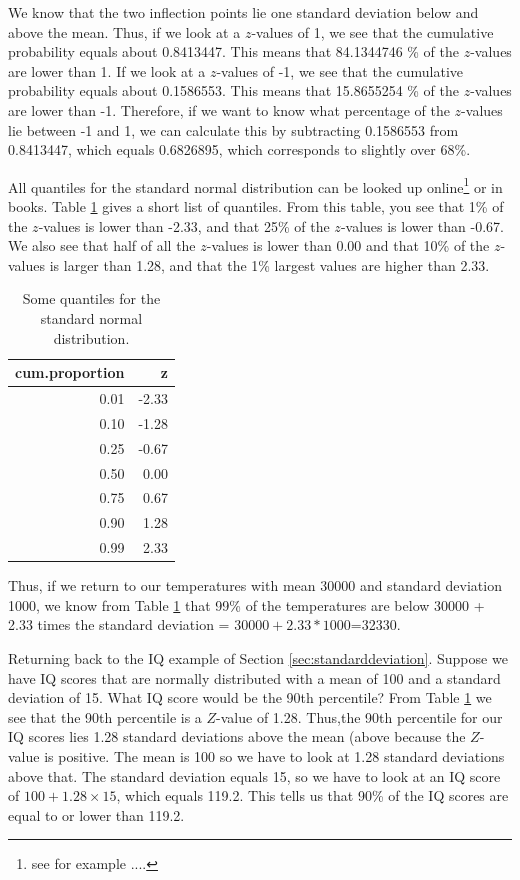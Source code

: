 \documentclass[]{book}\usepackage[]{graphicx}\usepackage[]{color}
\begin{document}
We know that the two inflection points lie one standard deviation below and above the mean. Thus, if we look at a $z$-values of 1, we see that the cumulative probability equals about 0.8413447. This means that 84.1344746 \% of the $z$-values are lower than 1. If we look at a $z$-values of -1, we see that the cumulative probability equals about 0.1586553. This means that 15.8655254 \% of the $z$-values are lower than -1. Therefore, if we want to know what percentage of the $z$-values lie between -1 and 1, we can calculate this by subtracting 0.1586553 from 0.8413447, which equals 0.6826895, which corresponds to slightly over 68\%.

All quantiles for the standard normal distribution can be looked up online\footnote{see for example ....} or in books. Table \ref{tab:normal_4} gives a short list of quantiles. From this table, you see that 1\% of the $z$-values is lower than -2.33, and that 25\% of the $z$-values is lower than -0.67. We also see that half of all the $z$-values is lower than 0.00 and that 10\% of the $z$-values is larger than 1.28, and that the 1\% largest values are higher than 2.33.

\begin{table}[ht]
\centering
\caption{Some quantiles for the standard normal distribution.} 
\label{tab:normal_4}
\begin{tabular}{rr}
  \hline
cum.proportion & z \\ 
  \hline
0.01 & -2.33 \\ 
  0.10 & -1.28 \\ 
  0.25 & -0.67 \\ 
  0.50 & 0.00 \\ 
  0.75 & 0.67 \\ 
  0.90 & 1.28 \\ 
  0.99 & 2.33 \\ 
   \hline
\end{tabular}
\end{table}



Thus, if we return to our temperatures with mean 30000 and standard deviation 1000, we know from Table \ref{tab:normal_4} that 99\% of the temperatures are below 30000 + 2.33 times the standard deviation =  $30000+2.33*1000$=32330.

Returning back to the IQ example of Section \ref{sec:standarddeviation}. Suppose we have IQ scores that are normally distributed with a mean of 100 and a standard deviation of 15. What IQ score would be the 90th percentile? From Table \ref{tab:normal_4} we see that the 90th percentile is a $Z$-value of 1.28. Thus,the 90th percentile for our IQ scores lies 1.28 standard deviations above the mean (above because the $Z$-value is positive. The mean is 100 so we have to look at 1.28 standard deviations above that. The standard deviation equals 15, so we have to look at an IQ score of $100 + 1.28 \times 15$, which equals 119.2. This tells us that 90\% of the IQ scores are equal to or lower than 119.2.
\end{document}
